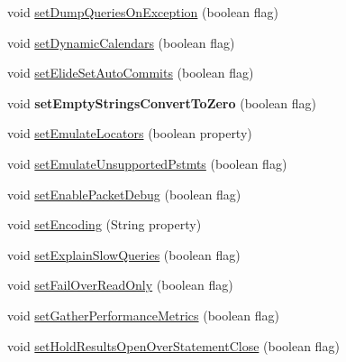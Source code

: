 \begin{DoxyCompactItemize}
\item 
void \mbox{\hyperlink{interfacecom_1_1mysql_1_1jdbc_1_1_connection_properties_a4bdf459325c8a9a96459959ea493f6a3}{set\+Dump\+Queries\+On\+Exception}} (boolean flag)
\item 
void \mbox{\hyperlink{interfacecom_1_1mysql_1_1jdbc_1_1_connection_properties_a01fd5822e9a8d49fb51172c50e3d0d31}{set\+Dynamic\+Calendars}} (boolean flag)
\item 
void \mbox{\hyperlink{interfacecom_1_1mysql_1_1jdbc_1_1_connection_properties_ae95924c9d1da3b93b44b58b33089d251}{set\+Elide\+Set\+Auto\+Commits}} (boolean flag)
\item 
\mbox{\label{interfacecom_1_1mysql_1_1jdbc_1_1_connection_properties_acf7625d17f6b13e75d742fcefcc8931f}} 
void {\bfseries set\+Empty\+Strings\+Convert\+To\+Zero} (boolean flag)
\item 
void \mbox{\hyperlink{interfacecom_1_1mysql_1_1jdbc_1_1_connection_properties_a3cbd4f864707e036d8013706d632a807}{set\+Emulate\+Locators}} (boolean property)
\item 
void \mbox{\hyperlink{interfacecom_1_1mysql_1_1jdbc_1_1_connection_properties_ad1ece011a4fffaed971f9849aa966183}{set\+Emulate\+Unsupported\+Pstmts}} (boolean flag)
\item 
void \mbox{\hyperlink{interfacecom_1_1mysql_1_1jdbc_1_1_connection_properties_a544989b319bc9a8c941c8c969011fcb5}{set\+Enable\+Packet\+Debug}} (boolean flag)
\item 
void \mbox{\hyperlink{interfacecom_1_1mysql_1_1jdbc_1_1_connection_properties_a8d675a0b52e236df15eec3c77dfd8089}{set\+Encoding}} (String property)
\item 
void \mbox{\hyperlink{interfacecom_1_1mysql_1_1jdbc_1_1_connection_properties_a9857fb61eea34e28c3bbff76b6ac5ca9}{set\+Explain\+Slow\+Queries}} (boolean flag)
\item 
void \mbox{\hyperlink{interfacecom_1_1mysql_1_1jdbc_1_1_connection_properties_acc1561f34ff6aaa02a3a6c0e6184644f}{set\+Fail\+Over\+Read\+Only}} (boolean flag)
\item 
void \mbox{\hyperlink{interfacecom_1_1mysql_1_1jdbc_1_1_connection_properties_a8083ba3dcac8d6d8ec42c635f0f19be4}{set\+Gather\+Performance\+Metrics}} (boolean flag)
\item 
void \mbox{\hyperlink{interfacecom_1_1mysql_1_1jdbc_1_1_connection_properties_a9447a03edd2efdd020960e0a12d22aa7}{set\+Hold\+Results\+Open\+Over\+Statement\+Close}} (boolean flag)

\end{DoxyCompactItemize}

